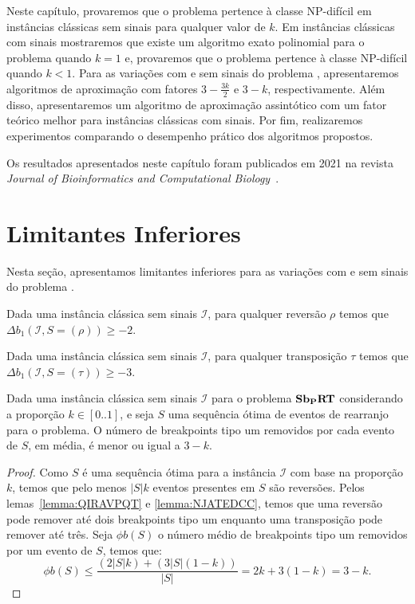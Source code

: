 Neste capítulo, provaremos que o problema \SbPRT{} pertence à classe NP-difícil em instâncias clássicas sem sinais para qualquer valor de $k$. Em instâncias clássicas com sinais mostraremos que existe um algoritmo exato polinomial para o problema quando $k=1$ e, provaremos que o problema pertence à classe NP-difícil quando $k < 1$. Para as variações com e sem sinais do problema \SbPRT{}, apresentaremos algoritmos de aproximação com fatores $3 - \frac{3k}{2}$ e $3-k$, respectivamente. Além disso, apresentaremos um algoritmo de aproximação assintótico com um fator teórico melhor para instâncias clássicas com sinais. Por fim, realizaremos experimentos comparando o desempenho prático dos algoritmos propostos.

Os resultados apresentados neste capítulo foram publicados em 2021 na revista \emph{Journal of Bioinformatics and Computational Biology}~\cite{2021a-brito-etal}.

\section{Limitantes Inferiores}

Nesta seção, apresentamos limitantes inferiores para as variações com e sem sinais do problema \SbPRT{}.

\begin{lemma}\label{lemma:QIRAVPQT}
Dada uma instância clássica sem sinais $\mathcal{I}$, para qualquer reversão $\rho$ temos que $\Delta b_1(\mathcal{I}, S = (\rho)) \ge -2$.
\end{lemma}

\begin{lemma}\label{lemma:NJATEDCC}
Dada uma instância clássica sem sinais $\mathcal{I}$, para qualquer transposição $\tau$ temos que $\Delta b_1(\mathcal{I}, S = (\tau)) \ge -3$.
\end{lemma}

\begin{lemma}\label{lemma:JYYZBREC}
Dada uma instância clássica sem sinais $\mathcal{I}$ para o problema $\textbf{Sb\textsubscript{P}RT}{}$ considerando a proporção $k \in [0..1]$, e seja $S$ uma sequência ótima de eventos de rearranjo para o problema. O número de breakpoints tipo um removidos por cada evento de $S$, em média, é menor ou igual a $3-k$.
\end{lemma}
\begin{proof}
Como $S$ é uma sequência ótima para a instância $\mathcal{I}$ com base na proporção $k$, temos que pelo menos $|S|k$ eventos presentes em $S$ são reversões. Pelos lemas~\ref{lemma:QIRAVPQT} e \ref{lemma:NJATEDCC}, temos que uma reversão pode remover até dois breakpoints tipo um enquanto uma transposição pode remover até três. Seja $\phi b(S)$ o número médio de breakpoints tipo um removidos por um evento de $S$, temos que:
$$\phi b(S) \le \frac{(2 |S| k) + (3 |S| (1 - k))}{|S|} = 2k + 3(1 - k) = 3 - k.$$ 
\end{proof}

